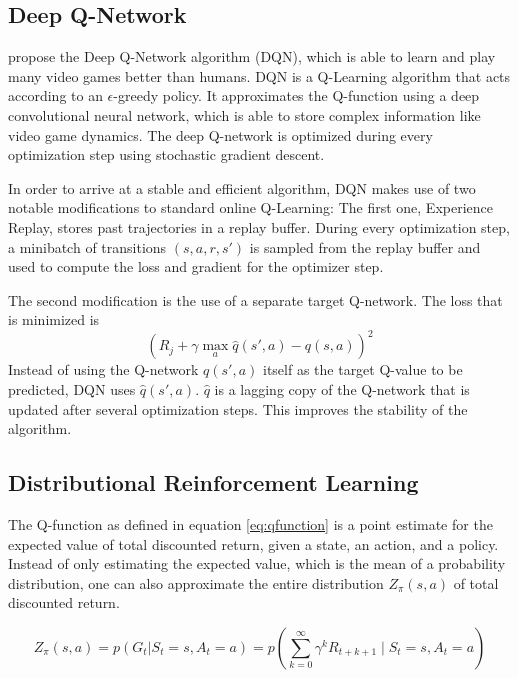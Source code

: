 \subsection{Deep Q-Network}
\cite{mnih2015HumanlevelControlDeep} propose the Deep Q-Network algorithm (DQN), which is able to learn and play many video games better than humans.
DQN is a Q-Learning algorithm that acts according to an $\epsilon$-greedy policy.
It approximates the Q-function using a deep convolutional neural network, which is able to store complex information like video game dynamics.
The deep Q-network is optimized during every optimization step using stochastic gradient descent.

In order to arrive at a stable and efficient algorithm, DQN makes use of two notable modifications to standard online Q-Learning:
The first one, Experience Replay, stores past trajectories in a replay buffer.
During every optimization step, a minibatch of transitions $(s, a, r, s')$ is sampled from the replay buffer and used to compute the loss and gradient for the optimizer step.

The second modification is the use of a separate target Q-network.
The loss that is minimized is
\begin{equation}
    \left(R_j + \gamma \max_a{\hat{q}(s',a)} - q(s,a)\right)^2
\end{equation}
Instead of using the Q-network $q(s',a)$ itself as the target Q-value to be predicted, DQN uses $\hat{q}(s',a)$.
$\hat{q}$ is a lagging copy of the Q-network that is updated after several optimization steps.
This improves the stability of the algorithm.

\subsection{Distributional Reinforcement Learning}
The Q-function as defined in equation \ref{eq:qfunction} is a point estimate for the expected value of total discounted return, given a state, an action, and a policy.
Instead of only estimating the expected value, which is the mean of a probability distribution, one can also approximate the entire distribution $Z_\pi(s,a)$ of total discounted return.

\begin{equation} \label{eq:zfunction}
    Z_\pi(s,a) = p(G_t | S_t=s, A_t = a) = p\left(\sum_{k=0}^{\infty}\gamma^kR_{t+k+1} \mid S_t = s, A_t = a\right)
\end{equation}

